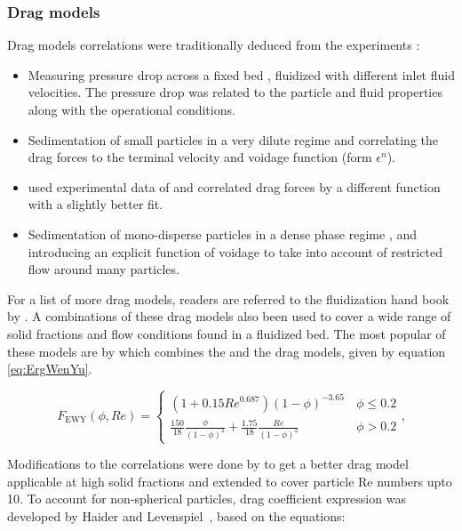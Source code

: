\documentclass[11pt,a4paper,openright]{article}
\begin{document}
\subsubsection{Drag models}

Drag models correlations were traditionally deduced from the experiments \citep{ergun1952fluid,wen1966generalized,di1994voidage}:

\begin{itemize}
\item Measuring pressure drop across a fixed bed \citep{ergun1952fluid}, fluidized with different inlet fluid velocities. The pressure drop was related to the particle and fluid properties along with the operational conditions.  
\item Sedimentation of small particles in a very dilute regime \citep{richardson1954sedimentation} and correlating the drag forces to the terminal velocity and voidage function (form $\epsilon^{n}$).
\item \citet{wen1966generalized} used experimental data of \citet{richardson1954sedimentation} and correlated drag forces by a different function with a slightly better fit. 
\item Sedimentation of mono-disperse particles in a dense phase regime \citep{di1994voidage}, and introducing an explicit function of voidage to take into account of restricted flow around many particles.
\end{itemize}

For a list of more drag models, readers are referred to the fluidization hand book by \citet{yang2003handbook}. A combinations of these drag models also been used to cover a wide range of solid fractions and flow conditions found in a fluidized bed. The most popular of these models are by \citet{gidaspow1994multiphase} which combines the \citet{ergun1952fluid} and the \citet{wen1966generalized} drag models, given by equation \ref{eq:ErgWenYu}. 

\begin{equation}
\label{eq:ErgWenYu}
F_{\mathrm{EWY}}(\phi,Re) = \begin{cases} 
(1+ 0.15Re^{0.687})(1-\phi)^{-3.65} &\,
 \phi \leq 0.2 \\ 
\frac{150}{18}\frac{\phi}{(1-\phi)^2}  + \frac{1.75}{18}\frac{Re}{(1-\phi)^2} &\, \phi > 0.2 
\end{cases} \text{,}
\end{equation} 

Modifications to the \citet{richardson1954sedimentation} correlations were done by \citet{syamlal1987generalized} to get a better drag model applicable at high solid fractions and extended to cover particle Re numbers upto 10. To account for non-spherical particles, drag coefficient expression was developed by Haider and Levenspiel~\cite{haider1989drag}, based on the \citet{di1994voidage} equations: 
\end{document}
